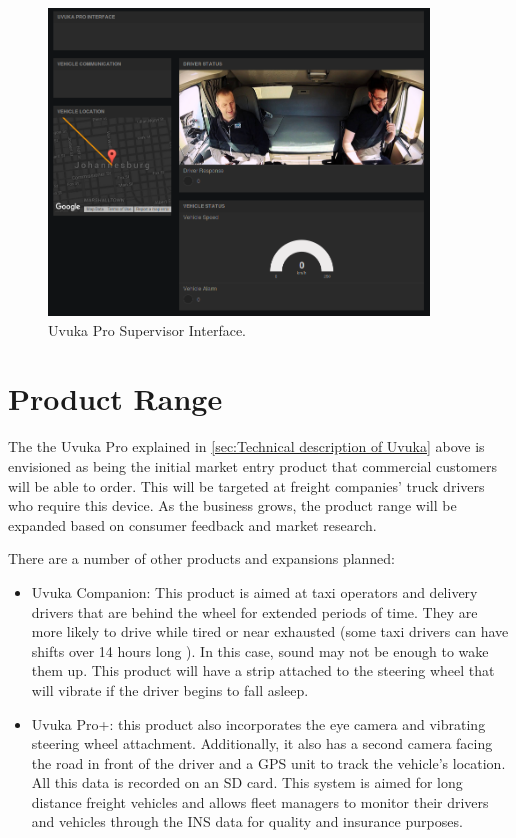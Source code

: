 \begin{figure}[H]
\centering
\includegraphics[width=0.9\textwidth]{images/uvuka-interface.png}
\vskip10pt
\caption[Uvuka Interface]{Uvuka Pro Supervisor Interface.}
\label{fig:UvukaInterface}
\end{figure}

\section{Product Range}
The the Uvuka Pro explained in \cref{sec:Technical description of Uvuka} above is envisioned as being the initial market entry product that commercial customers will be able to order. This will be targeted at freight companies' truck drivers who require this device. As the business grows, the product range will be expanded based on consumer feedback and market research.

There are a number of other products and expansions planned:
\begin{itemize}
\item Uvuka Companion: This product is aimed at taxi operators and delivery drivers that are behind the wheel for extended periods of time. They are more likely to drive while tired or near exhausted (some taxi drivers can have shifts over 14 hours long \cite{taxiDriverHours}). In this case, sound may not be enough to wake them up. This product will have a strip attached to the steering wheel that will vibrate if the driver begins to fall asleep.
\item Uvuka Pro+: this product also incorporates the eye camera and vibrating steering wheel attachment. Additionally, it also has a second camera facing the road in front of the driver and a GPS unit to track the vehicle's location. All this data is recorded on an SD card. This system is aimed for long distance freight vehicles and allows fleet managers to monitor their drivers and vehicles through the INS data for quality and insurance purposes.
\end{itemize}

